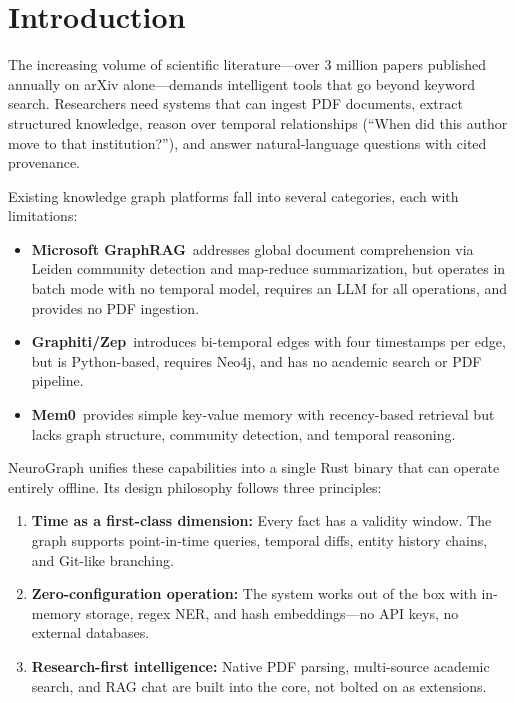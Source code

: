 \documentclass[11pt,twocolumn]{article}
\begin{document}
\section{Introduction}
\label{sec:intro}

The increasing volume of scientific literature—over 3 million papers published annually on arXiv alone—demands intelligent tools that go beyond keyword search. Researchers need systems that can ingest PDF documents, extract structured knowledge, reason over temporal relationships (``When did this author move to that institution?''), and answer natural-language questions with cited provenance.

Existing knowledge graph platforms fall into several categories, each with limitations:

\begin{itemize}[nosep]
  \item \textbf{Microsoft GraphRAG}~addresses global document comprehension via Leiden community detection and map-reduce summarization, but operates in batch mode with no temporal model, requires an LLM for all operations, and provides no PDF ingestion.
  \item \textbf{Graphiti/Zep}~introduces bi-temporal edges with four timestamps per edge, but is Python-based, requires Neo4j, and has no academic search or PDF pipeline.
  \item \textbf{Mem0}~provides simple key-value memory with recency-based retrieval but lacks graph structure, community detection, and temporal reasoning.
\end{itemize}

NeuroGraph unifies these capabilities into a single Rust binary that can operate entirely offline. Its design philosophy follows three principles:

\begin{enumerate}[nosep]
  \item \textbf{Time as a first-class dimension:} Every fact has a validity window. The graph supports point-in-time queries, temporal diffs, entity history chains, and Git-like branching.
  \item \textbf{Zero-configuration operation:} The system works out of the box with in-memory storage, regex NER, and hash embeddings—no API keys, no external databases.
  \item \textbf{Research-first intelligence:} Native PDF parsing, multi-source academic search, and RAG chat are built into the core, not bolted on as extensions.
\end{enumerate}
\end{document}
